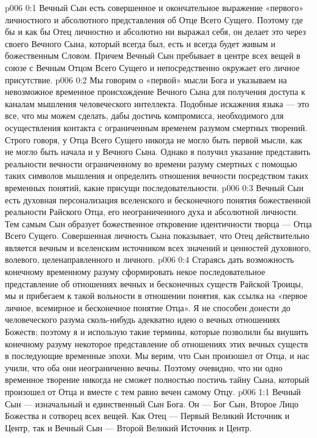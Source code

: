 \author{Божественный Советник}
\vs p006 0:1 Вечный Сын есть совершенное и окончательное выражение «первого» личностного и абсолютного представления об Отце Всего Сущего. Поэтому где бы и как бы Отец личностно и абсолютно ни выражал себя, он делает это через своего Вечного Сына, который всегда был, есть и всегда будет живым и божественным Словом. Причем Вечный Сын пребывает в центре всех вещей в союзе с Вечным Отцом Всего Сущего и непосредственно окружает его личное присутствие.
\vs p006 0:2 Мы говорим о «первой» мысли Бога и указываем на невозможное временное происхождение Вечного Сына для получения доступа к каналам мышления человеческого интеллекта. Подобные искажения языка --- это все, что мы можем сделать, дабы достичь компромисса, необходимого для осуществления контакта с ограниченным временем разумом смертных творений. Строго говоря, у Отца Всего Сущего никогда не могло быть первой мысли, как не могло быть начала и у Вечного Сына. Однако я получил указание представить реальности вечности ограниченному во времени разуму смертных с помощью таких символов мышления и определить отношения вечности посредством таких временных понятий, какие присущи последовательности.
\vs p006 0:3 Вечный Сын есть духовная персонализация вселенского и бесконечного понятия божественной реальности Райского Отца, его неограниченного духа и абсолютной личности. Тем самым Сын образует божественное откровение идентичности творца --- Отца Всего Сущего. Совершенная личность Сына показывает, что Отец действительно является вечным и вселенским источником всех значений и ценностей духовного, волевого, целенаправленного и личного.
\vs p006 0:4 Стараясь дать возможность конечному временному разуму сформировать некое последовательное представление об отношениях вечных и бесконечных существ Райской Троицы, мы и прибегаем к такой вольности в отношении понятия, как ссылка на «первое личное, всемирное и бесконечное понятие Отца». Я не способен донести до человеческого разума сколь\hyp{}нибудь адекватно идею о вечных отношениях Божеств; поэтому я и использую такие термины, которые позволили бы внушить конечному разуму некоторое представление об отношениях этих вечных существ в последующие временные эпохи. Мы верим, что Сын произошел от Отца, и нас учили, что оба они неограниченно вечны. Поэтому очевидно, что ни одно временное творение никогда не сможет полностью постичь тайну Сына, который произошел от Отца и вместе с тем равно вечен самому Отцу.
\vs p006 1:1 Вечный Сын --- изначальный и единственный Сын Бога. Он --- Бог Сын, Второе Лицо Божества и сотворец всех вещей. Как Отец --- Первый Великий Источник и Центр, так и Вечный Сын --- Второй Великий Источник и Центр.
